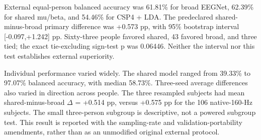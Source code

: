 \documentclass[11pt]{article}
\begin{document}
External equal-person balanced accuracy was 61.81\% for broad EEGNet, 62.39\% for shared mu/beta, and 54.46\% for CSP4 + LDA. The predeclared shared-minus-broad primary difference was +0.573 pp, with 95\% bootstrap interval [-0.097,+1.242] pp. Sixty-three people favored shared, 43 favored broad, and three tied; the exact tie-excluding sign-test p was 0.06446. Neither the interval nor this test establishes external superiority.

Individual performance varied widely. The shared model ranged from 39.33\% to 97.07\% balanced accuracy, with median 58.73\%. Three-seed average differences also varied in direction across people. The three resampled subjects had mean shared-minus-broad $\Delta$ = +0.514 pp, versus +0.575 pp for the 106 native-160-Hz subjects. The small three-person subgroup is descriptive, not a powered subgroup test. This result is reported with the sampling-rate and validation-portability amendments, rather than as an unmodified original external protocol.
\end{document}
